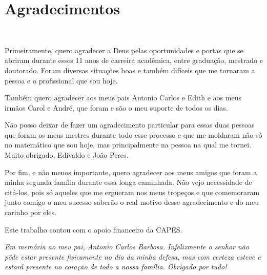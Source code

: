 \documentclass[12pt,oneside]{book} %
\begin{document}
\chapter*{Agradecimentos}
\thispagestyle{empty}

\

\par Primeiramente, quero agradecer a Deus pelas oportunidades e portas que se abriram durante esses 11 anos de carreira acadêmica, entre graduação, mestrado e doutorado. Foram diversas situações boas e também difíceis que me tornaram a pessoa e o profissional que sou hoje.

\par Também quero agradecer aos meus pais Antonio Carlos e Edith e aos meus irmãos Carol e André, que foram e são o meu suporte de todos os dias.

\par Não posso deixar de fazer um agradecimento particular para essas duas pessoas que foram os meus mestres durante todo esse processo e que me moldaram não só no matemático que sou hoje, mas principalmente na pessoa na qual me tornei. Muito obrigado, Edivaldo e João Peres.

\par Por fim, e não menos importante, quero agradecer aos meus amigos que foram a minha segunda família durante essa longa caminhada. Não vejo necessidade de citá-los, pois só aqueles que me ergueram nos meus tropeços e que comemoraram junto comigo o meu sucesso saberão o real motivo desse agradecimento e do meu carinho por eles.

\par Este trabalho contou com o apoio financeiro da CAPES.

\vspace{2cm}

	\begin{center}
		\begin{minipage}{10cm}
			\textit{Em memória ao meu pai, Antonio Carlos Barbosa. Infelizmente o senhor não pôde estar presente fisicamente no dia da minha defesa, mas com certeza esteve e estará presente no coração de todo a nossa família. Obrigado por tudo!}
		\end{minipage}
	\end{center}





\end{document}
